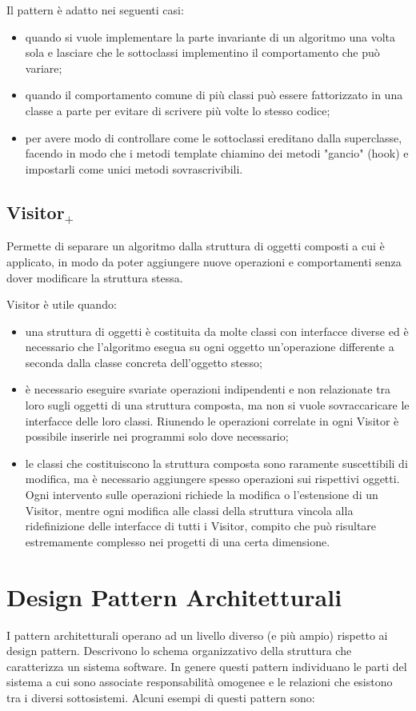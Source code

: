 Il pattern è adatto nei seguenti casi:
\begin{itemize}
\item quando si vuole implementare la parte invariante di un algoritmo una volta sola e lasciare che le sottoclassi implementino il comportamento che può variare;
\item quando il comportamento comune di più classi può essere fattorizzato in una classe a parte per evitare di scrivere più volte lo stesso codice;
\item per avere modo di controllare come le sottoclassi ereditano dalla superclasse, facendo in modo che i metodi template chiamino dei metodi "gancio" (hook) e impostarli come unici metodi sovrascrivibili.
\end{itemize}

\subsection{Visitor$_+$}
Permette di separare un algoritmo dalla struttura di oggetti composti a cui è applicato, in modo da poter aggiungere nuove operazioni e comportamenti senza dover modificare la struttura stessa.

Visitor è utile quando:
\begin{itemize}
	\item una struttura di oggetti è costituita da molte classi con interfacce diverse ed è necessario che l'algoritmo esegua su ogni oggetto un'operazione differente a seconda dalla classe concreta dell'oggetto stesso;
	\item è necessario eseguire svariate operazioni indipendenti e non relazionate tra loro sugli oggetti di una struttura composta, ma non si vuole sovraccaricare le interfacce delle loro classi. Riunendo le operazioni correlate in ogni Visitor è possibile inserirle nei programmi solo dove necessario;
	\item le classi che costituiscono la struttura composta sono raramente suscettibili di modifica, ma è necessario aggiungere spesso operazioni sui rispettivi oggetti. Ogni intervento sulle operazioni richiede la modifica o l'estensione di un Visitor, mentre ogni modifica alle classi della struttura vincola alla ridefinizione delle interfacce di tutti i Visitor, compito che può risultare estremamente complesso nei progetti di una certa dimensione.
\end{itemize}

\section{Design Pattern Architetturali}
I pattern architetturali operano ad un livello diverso (e più ampio) rispetto ai design pattern. Descrivono lo schema organizzativo della struttura che caratterizza un sistema software.
In genere questi pattern individuano le parti del sistema a cui sono associate responsabilità omogenee e le relazioni che esistono tra i diversi sottosistemi.
Alcuni esempi di questi pattern sono:


